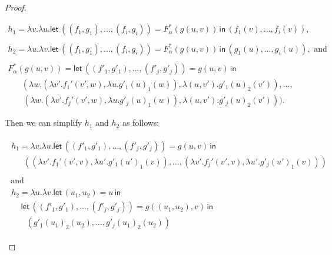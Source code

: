 \documentclass{elsarticle}
\begin{document}
\begin{proof}
\begin{report}
\begin{center}
\begin{itemize}
\begin{center}
\begin{math}
\begin{array}{lll}
            h_1 = \lambda v.\lambda u.\mathsf{let}\,((f_1,g_1),\ldots,(f_i,g_i)) = F^*_\alpha(g(u,v))\,\mathsf{in}\,
            (f_1(v),\ldots,f_i(v)),\\
            \\
            h_2 = \lambda u.\lambda v.\mathsf{let}\,((f_1,g_1),\ldots,(f_i,g_i)) = F^*_\alpha(g(u,v)) \,\mathsf{in}\,
           (g_1(u),\ldots,g_i(u)), \text{ and }\\
           \\
           F^*_\alpha(g(u,v)) = \mathsf{let}\, ((f'_1,g'_1),\ldots,(f'_j,g'_j)) = g(u,v) \,\mathsf{in}\,\\
      \,\,\,\,\,\,\,\,\,\,(\lambda w.(\lambda v'.f_1'(v',w),\lambda u.g'_1(u)_1(w)),\lambda (u,v').g'_1(u)_2(v')),\ldots,\\
      \,\,\,\,\,\,\,\,\,\,\,(\lambda w.(\lambda v'.f_j'(v',w),\lambda u.g'_j(u)_1(w)),\lambda (u,v').g'_j(u)_2(v'))).
          \end{array}
        \end{math}
      \end{center}
      Then we can simplify $h_1$ and $h_2$ as follows:
      \begin{center}
        \begin{math}
          \begin{array}{lll}
            \begin{array}{lll}
              h_1 = \lambda v.\lambda u.\mathsf{let}\,((f'_1,g'_1),\ldots,(f'_j,g'_j)) = g(u,v)\,\mathsf{in}\,\\
              \,\,\,\,\,\,\,\,\,((\lambda v'.f_1'(v',v),\lambda u'.g'_1(u')_1(v)),\ldots,(\lambda v'.f_j'(v',v),\lambda u'.g'_j(u')_1(v))) \\
            \end{array}\\
            \text{ and }\\
            \begin{array}{lll}
              h_2 = \lambda u.\lambda v.\mathsf{let}\,(u_1,u_2) = u\,\mathsf{in}\, \\
              \,\,\,\,\,\,\,\mathsf{let}\,((f'_1,g'_1),\ldots,(f'_j,g'_j)) = g((u_1,u_2),v) \,\mathsf{in}\,\\
              \,\,\,\,\,\,\,\,\,\,\,(g'_1(u_1)_2(u_2),\ldots,g'_j(u_1)_2(u_2))
            \end{array}
          \end{array}
        \end{math}
      \end{center}

\end{itemize}
\end{center}
\end{report}
\end{proof}
\end{document}
